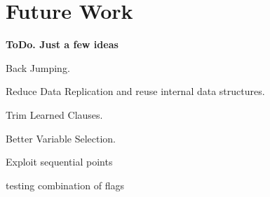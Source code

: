 \chapter{Future Work}
\label{chap:future}

\textbf{ToDo. Just a few ideas}

Back Jumping.

Reduce Data Replication and reuse internal data structures.

Trim Learned Clauses.

Better Variable Selection.

Exploit sequential points

testing combination of flags
